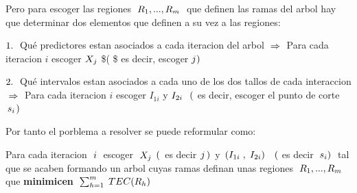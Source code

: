 \documentclass[
  11pt,
  a4paper,
]{article}
\begin{document}
\vspace{0.35cm}

Pero para escoger las regiones
\(\hspace{0.1cm} R_1,...,R_m \hspace{0.1cm}\) que definen las ramas del
arbol hay que determinar dos elementos que definen a su vez a las
regiones:

\(1.\hspace{0.1cm}\) Qué predictores estan asociados a cada iteracion
del arbol \(\hspace{0.1cm} \Rightarrow \hspace{0.1cm}\) Para cada
iteracion \(i\) escoger \(X_j \hspace{0.01cm}\) \$(\hspace{0.01cm} \$ es
decir, escoger \(j \hspace{0.01cm})\)

\(2.\hspace{0.1cm}\) Qué intervalos estan asociados a cada uno de los
dos tallos de cada interaccion
\(\hspace{0.1cm} \Rightarrow \hspace{0.1cm}\) Para cada iteracion \(i\)
escoger \(I_{1i}\) y \(I_{2i}\hspace{0.1cm}\) \((\hspace{0.01cm}\) es
decir, escoger el punto de corte
\(\hspace{0.07cm}s_i \hspace{0.04cm} )\)

Por tanto el porblema a resolver se puede reformular como:

Para cada iteracion \(\hspace{0.1cm} i \hspace{0.1cm}\) escoger
\(\hspace{0.1cm} X_j\hspace{0.01cm}\) \((\hspace{0.05cm}\) es decir
\(\hspace{0.01cm}j \hspace{0.05cm})\hspace{0.05cm}\) y
\(\hspace{0.05cm}( I_{1i}\hspace{0.1cm},\hspace{0.1cm}I_{2i} )\hspace{0.1cm}\)
\(\hspace{0.1cm}(\) es decir \(\hspace{0.1cm} s_i)\hspace{0.1cm}\) tal
que se acaben formando un arbol cuyas ramas definan unas regiones
\(\hspace{0.1cm}R_1,...,R_m\hspace{0.1cm}\) que \textbf{minimicen}
\(\hspace{0.1cm}\sum_{h=1}^{m} \hspace{0.1cm} TEC(R_h)\)
\end{document}

